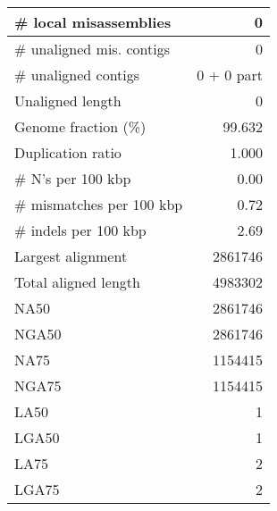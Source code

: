 \documentclass[12pt,a4paper]{article}
\begin{document}
\begin{table}[ht]
\begin{center}
\begin{tabular}{|l*{1}{|r}|}
\# local misassemblies & 0 \\ \hline
\# unaligned mis. contigs & 0 \\ \hline
\# unaligned contigs & 0 + 0 part \\ \hline
Unaligned length & 0 \\ \hline
Genome fraction (\%) & 99.632 \\ \hline
Duplication ratio & 1.000 \\ \hline
\# N's per 100 kbp & 0.00 \\ \hline
\# mismatches per 100 kbp & 0.72 \\ \hline
\# indels per 100 kbp & 2.69 \\ \hline
Largest alignment & 2861746 \\ \hline
Total aligned length & 4983302 \\ \hline
NA50 & 2861746 \\ \hline
NGA50 & 2861746 \\ \hline
NA75 & 1154415 \\ \hline
NGA75 & 1154415 \\ \hline
LA50 & 1 \\ \hline
LGA50 & 1 \\ \hline
LA75 & 2 \\ \hline
LGA75 & 2 \\ \hline
\end{tabular}
\end{center}
\end{table}
\end{document}
